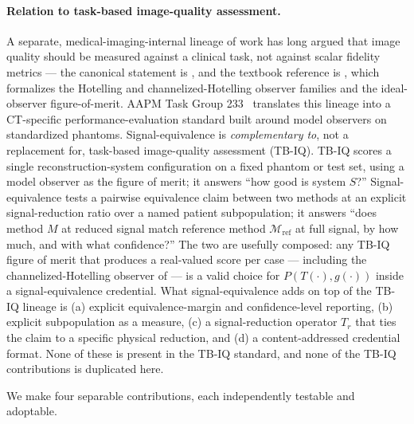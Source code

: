\documentclass[twoside,11pt]{article}
\newcommand{\Mref}{\mathcal{M}_{\textrm{ref}}}
\begin{document}
\paragraph{Relation to task-based image-quality assessment.} A separate, medical-imaging-internal lineage of work has long argued that image quality should be measured against a clinical task, not against scalar fidelity metrics --- the canonical statement is \citet{barrett1990objective}, and the textbook reference is \citet{barrett2013foundations}, which formalizes the Hotelling and channelized-Hotelling observer families and the ideal-observer figure-of-merit. AAPM Task Group 233~\citep{samei2019tg233} translates this lineage into a CT-specific performance-evaluation standard built around model observers on standardized phantoms. Signal-equivalence is \emph{complementary to}, not a replacement for, task-based image-quality assessment (TB-IQ). TB-IQ scores a single reconstruction-system configuration on a fixed phantom or test set, using a model observer as the figure of merit; it answers ``how good is system $S$?'' Signal-equivalence tests a pairwise equivalence claim between two methods at an explicit signal-reduction ratio over a named patient subpopulation; it answers ``does method $M$ at reduced signal match reference method $\Mref$ at full signal, by how much, and with what confidence?'' The two are usefully composed: any TB-IQ figure of merit that produces a real-valued score per case --- including the channelized-Hotelling observer of \citet{barrett2013foundations} --- is a valid choice for $P(T(\cdot), g(\cdot))$ inside a signal-equivalence credential. What signal-equivalence adds on top of the TB-IQ lineage is (a) explicit equivalence-margin and confidence-level reporting, (b) explicit subpopulation as a measure, (c) a signal-reduction operator $T_r$ that ties the claim to a specific physical reduction, and (d) a content-addressed credential format. None of these is present in the TB-IQ standard, and none of the TB-IQ contributions is duplicated here.

We make four separable contributions, each independently testable and adoptable.
\end{document}
